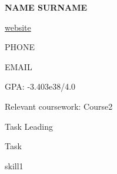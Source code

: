 \documentclass{resume}
\begin{document}
\begin{minipage}{0.6\textwidth}
	{\LARGE\bf \uppercase{Name Surname}}

	\url{website}
\end{minipage}
\hfill
\begin{minipage}{0.3\textwidth}
	\hfill PHONE
	
	\hfill EMAIL
\end{minipage}

\begin{LIST}
    \item GPA: -3.403e38/4.0
    \item Relevant coursework: Course2
\end{LIST}

\begin{LIST}
	\item Task Leading
\end{LIST}

\begin{LIST}
	\item Task
\end{LIST}

\begin{LIST}
	\item skill1
\end{LIST}
\end{document}
